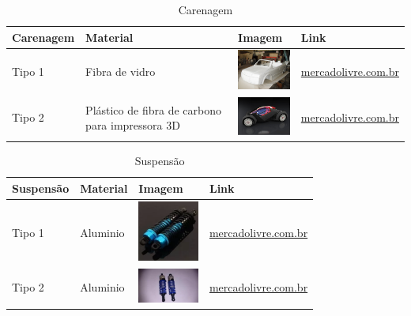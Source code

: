     \begin{table}[!htbp]
    	\begin{center}
    		\caption{Carenagem}
    		\begin{tabular}{|p{3cm}|p{3cm}|p{2cm}|p{4cm}|}
    			\hline
    			\textbf{Carenagem} & \textbf{Material} & \textbf{Imagem} & \textbf{Link}\\\hline\hline
    			Tipo 1 & Fibra de vidro & \includegraphics[width=2cm]{figuras/carenagem_fibra.eps} & \href{http://produto.mercadolivre.com.br/MLB-712761072-kit-resina-500g-manta-fibra-de-vidro-300g-10g-catalizador-_JM}{mercadolivre.com.br}\\\hline
    			Tipo 2 & Plástico de fibra de carbono para impressora 3D & \includegraphics[width=2cm]{figuras/carenagem_plastico.eps} & \href{http://produto.mercadolivre.com.br/MLB-704169297-envelopamento-fibra-carbono-teto-ou-capo-1x122-_JM}{mercadolivre.com.br}\\\hline
    		\end{tabular}
    	\end{center}
    \end{table}

    \begin{table}[!htbp]
    	\begin{center}
    		\caption{Suspensão}
    		\begin{tabular}{|p{3cm}|p{3cm}|p{2cm}|p{4cm}|}
    			\hline
    			\textbf{Suspensão} & \textbf{Material} & \textbf{Imagem} & \textbf{Link}\\\hline\hline
    			Tipo 1 & Aluminio & \includegraphics[width=2cm]{figuras/suspensao_aluminio_1.eps} & \href{http://produto.mercadolivre.com.br/MLB-689668697-par-amortecedor-aluminio-hsp-106004-06038-06062-rc-110-97mm-_JM}{mercadolivre.com.br}\\\hline
    			Tipo 2 & Aluminio & \includegraphics[width=2cm]{figuras/suspensao_aluminio_2.eps} & \href{http://produto.mercadolivre.com.br/MLB-722851070-par-de-amortecedor-75mm-para-automodelo-110-_JM}{mercadolivre.com.br}\\\hline
    		\end{tabular}
    	\end{center}
    \end{table}

